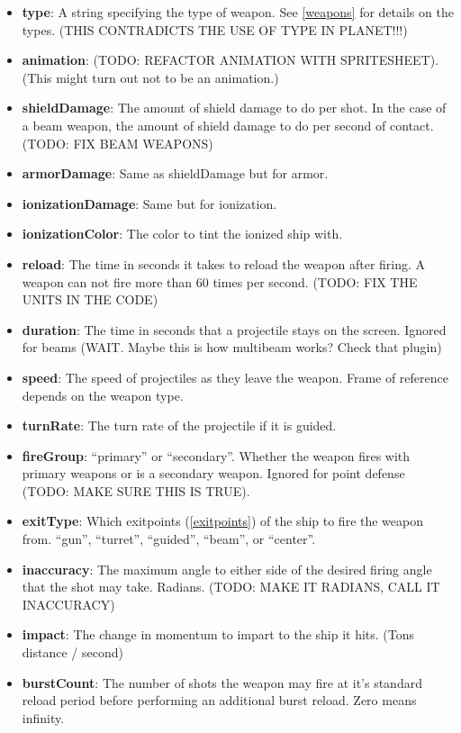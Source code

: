 \documentclass{article}
\begin{document}
\begin{itemize}
\item{\textbf{type}}: A string specifying the type of weapon. See \ref{weapons} for details on the types. (THIS CONTRADICTS THE USE OF TYPE IN PLANET!!!)
\item{\textbf{animation}}: (TODO: REFACTOR ANIMATION WITH SPRITESHEET). (This might turn out not to be an animation.)
\item{\textbf{shieldDamage}}: The amount of shield damage to do per shot. In the case of a beam weapon, the amount of shield damage to do per second of contact. (TODO: FIX BEAM WEAPONS)
\item{\textbf{armorDamage}}: Same as shieldDamage but for armor.
\item{\textbf{ionizationDamage}}: Same but for ionization.
\item{\textbf{ionizationColor}}: The color to tint the ionized ship with.
\item{\textbf{reload}}: The time in seconds it takes to reload the weapon after firing. A weapon can not fire more than 60 times per second. (TODO: FIX THE UNITS IN THE CODE)
\item{\textbf{duration}}: The time in seconds that a projectile stays on the screen. Ignored for beams (WAIT. Maybe this is how multibeam works? Check that plugin)
\item{\textbf{speed}}: The speed of projectiles as they leave the weapon. Frame of reference depends on the weapon type.
\item{\textbf{turnRate}}: The turn rate of the projectile if it is guided.
\item{\textbf{fireGroup}}: ``primary'' or ``secondary''. Whether the weapon fires with primary weapons or is a secondary weapon. Ignored for point defense (TODO: MAKE SURE THIS IS TRUE).
\item{\textbf{exitType}}: Which exitpoints (\ref{exitpoints}) of the ship to fire the weapon from. ``gun'', ``turret'', ``guided'', ``beam'', or ``center''.
\item{\textbf{inaccuracy}}: The maximum angle to either side of the desired firing angle that the shot may take. Radians. (TODO: MAKE IT RADIANS, CALL IT INACCURACY)
\item{\textbf{impact}}: The change in momentum to impart to the ship it hits. (Tons distance / second)
\item{\textbf{burstCount}}: The number of shots the weapon may fire at it's standard reload period before performing an additional burst reload. Zero means infinity.

\end{itemize}
\end{document}
